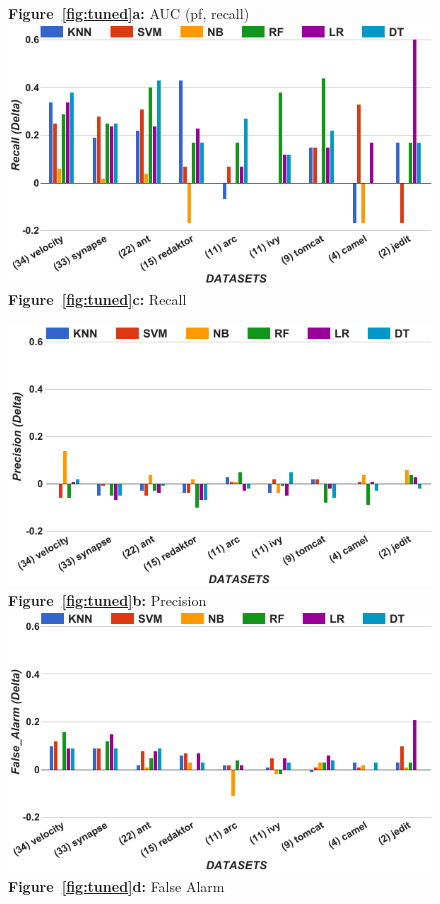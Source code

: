 \begin{figure}[!t]
\begin{minipage}{.5\linewidth}
  {\bf Figure~\ref{fig:tuned}a:} AUC (pf, recall)
        \includegraphics[width=.95\linewidth]{./fig/Recall_tuned.png}
  {\bf Figure~\ref{fig:tuned}c:} Recall
    \end{minipage}%
\begin{minipage}{.5\linewidth}
        \centering
        \includegraphics[width=.95\linewidth]{./fig/prec_tuned.png}
  {\bf Figure~\ref{fig:tuned}b:} Precision
        \includegraphics[width=.95\linewidth]{./fig/pf_tuned.png}
  {\bf Figure~\ref{fig:tuned}d:} False Alarm
    \end{minipage}%
    

\end{figure}
